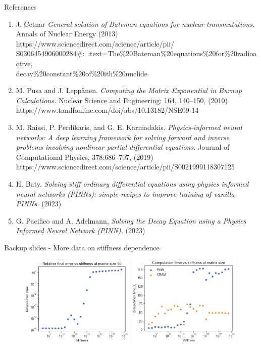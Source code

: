 \documentclass[9pt]{beamer}
\begin{document}
\begin{frame}[fragile]{References}
\footnotesize\begin{enumerate}
    \item J. Cetnar \textit{General solution of Bateman equations for nuclear transmutations.} Annals of Nuclear Energy (2013) https://www.sciencedirect.com/science/article/pii/\\S0306454906000284#:~:text=The\%20Bateman\%20equations\%20for\%20radioactive,\\decay\%20constant\%20of\%20ith\%20nuclide
    \item M. Pusa and J. Leppänen. \textit{Computing the Matrix Exponential in Burnup Calculations.} Nuclear Science and Engineering: 164, 140–150, (2010) https://www.tandfonline.com/doi/abs/10.13182/NSE09-14
    \item M. Raissi, P. Perdikaris, and G. E. Karniadakis.
         \textit{Physics-informed neural networks: A deep learning framework for solving forward and inverse problems involving nonlinear partial differential equations.}
         Journal of Computational Physics, 378:686–707, (2019) https://www.sciencedirect.com/science/article/pii/S0021999118307125
    \item H. Baty. \textit{Solving stiff ordinary differential equations using physics informed neural networks (PINNs): simple recipes to improve training of vanilla-PINNs.} (2023)
    \item G. Pacifico and A. Adelmann, \textit{Solving the Decay Equation using a Physics Informed Neural Network (PINN).} (2023)
\end{enumerate}
\end{frame}


\begin{frame}[fragile]{Backup slides - More data on stiffness dependence}
\begin{figure}
    \centering
    \includegraphics[width=0.49\textwidth]{error_vs_stiffness.png}
    \includegraphics[width=0.49\textwidth]{time_vs_stiffness.png}
    \label{fig:my_label}
\end{figure}
\end{frame}
\end{document}
